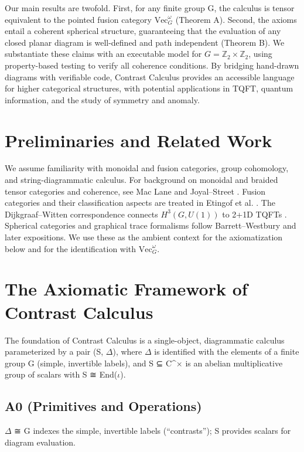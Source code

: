 \documentclass[11pt]{article}
\theoremstyle{definition}
\theoremstyle{remark}
\newcommand{\iotaunit}{\iota}
\begin{document}
Our main results are twofold. First, for any finite group G, the calculus is tensor equivalent to the pointed fusion category $\mathrm{Vec}_G^\omega$ (Theorem A). Second, the axioms entail a coherent spherical structure, guaranteeing that the evaluation of any closed planar diagram is well-defined and path independent (Theorem B). We substantiate these claims with an executable model for $G=\mathbb{Z}_2 \times \mathbb{Z}_2$, using property-based testing to verify all coherence conditions. By bridging hand-drawn diagrams with verifiable code, Contrast Calculus provides an accessible language for higher categorical structures, with potential applications in TQFT, quantum information, and the study of symmetry and anomaly.

\section{Preliminaries and Related Work}
We assume familiarity with monoidal and fusion categories, group cohomology, and string-diagrammatic calculus. For background on monoidal and braided tensor categories and coherence, see Mac Lane \cite{MacLane1998} and Joyal–Street \cite{JoyalStreet1993}. Fusion categories and their classification aspects are treated in Etingof et al. \cite{EGNO2015}. The Dijkgraaf–Witten correspondence connects $H^3(G, U(1))$ to 2+1D TQFTs \cite{DijkgraafWitten1990}. Spherical categories and graphical trace formalisms follow Barrett–Westbury \cite{BarrettWestbury1999} and later expositions. We use these as the ambient context for the axiomatization below and for the identification with $\mathrm{Vec}_G^\omega$.

\section{The Axiomatic Framework of Contrast Calculus}
The foundation of Contrast Calculus is a single-object, diagrammatic calculus parameterized by a pair (S, $\Delta$), where $\Delta$ is identified with the elements of a finite group G (simple, invertible labels), and S ⊆ C^× is an abelian multiplicative group of scalars with S ≅ End($\iotaunit$).

\subsection{A0 (Primitives and Operations)}
$\Delta$ ≅ G indexes the simple, invertible labels (“contrasts”); S provides scalars for diagram evaluation.
\end{document}
